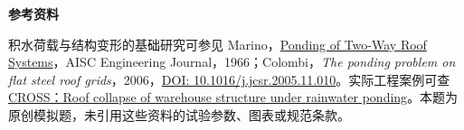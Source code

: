 \documentclass[11pt,a4paper]{article}
\begin{document}
\noindent\textbf{参考资料}

\small
积水荷载与结构变形的基础研究可参见 Marino，\href{https://ej.aisc.org/index.php/engj/article/view/1258}{Ponding of Two-Way Roof Systems}，AISC Engineering Journal，1966；Colombi，\textit{The ponding problem on flat steel roof grids}，2006，\href{https://doi.org/10.1016/j.jcsr.2005.11.010}{DOI: 10.1016/j.jcsr.2005.11.010}。实际工程案例可查 \href{https://www.cross-safety.org/uk/safety-information/cross-safety-report/roof-collapse-warehouse-structure-under-rainwater-969}{CROSS：Roof collapse of warehouse structure under rainwater ponding}。本题为原创模拟题，未引用这些资料的试验参数、图表或规范条款。
\end{document}
